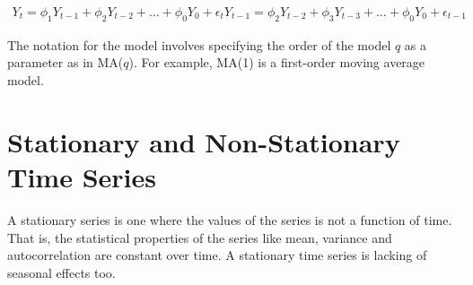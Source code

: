 \begin{equation}
\begin{gathered}
Y_t = \phi_1 Y_{t-1} + \phi_2 Y_{t-2} + \ldots + \phi_0 Y_{0} + \epsilon_t
Y_{t-1} = \phi_2 Y_{t-2} + \phi_3 Y_{t-3} + \ldots + \phi_0 Y_{0} + \epsilon_{t-1}
\end{gathered}
\end{equation}

The notation for the model involves specifying the order of the model $q$ as a parameter as in MA($q$). For example, MA(1) is a
first-order moving average model. 

\section{Stationary and Non-Stationary Time Series}
\label{stationary-and-non-stationary-time-series}

A stationary series is one where the values of the series is not a function of time. That is, the statistical properties of the series like mean, variance and autocorrelation are constant over time. A stationary time series is lacking of seasonal effects too.

